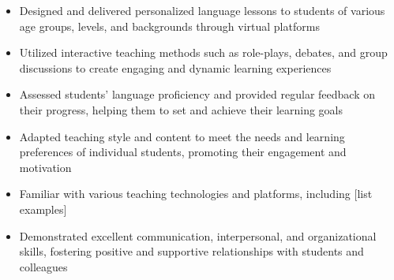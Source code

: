 \documentclass[
    10pt,
    A4,
    english,
    draft = false,
    twoside = false,
]{article}
\begin{document}
	\-\hspace{-.45cm}
	{
    \begin{itemize}
      \item Designed and delivered personalized language lessons to students of various age groups, levels, and backgrounds through virtual platforms
      \item Utilized interactive teaching methods such as role-plays, debates, and group discussions to create engaging and dynamic learning experiences
      \item Assessed students' language proficiency and provided regular feedback on their progress, helping them to set and achieve their learning goals
      \item Adapted teaching style and content to meet the needs and learning preferences of individual students, promoting their engagement and motivation
      \item Familiar with various teaching technologies and platforms, including [list examples]
      \item Demonstrated excellent communication, interpersonal, and organizational skills, fostering positive and supportive relationships with students and colleagues 
    \end{itemize}
    }\\
	{}
	{}
	{}
		{}
		{}
		{}
\end{document}
